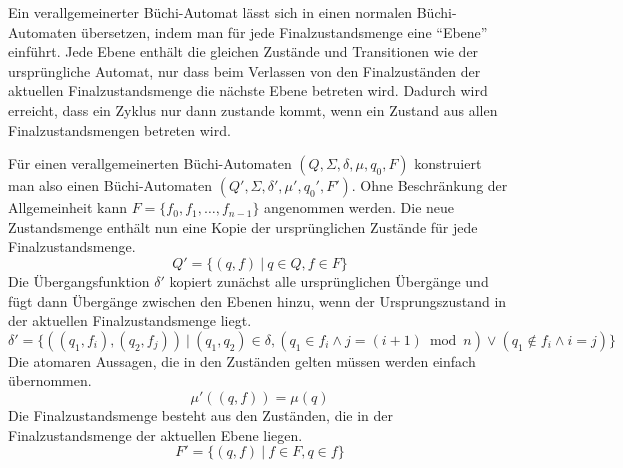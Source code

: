 Ein verallgemeinerter Büchi-Automat lässt sich in einen normalen Büchi-Automaten übersetzen, indem man für jede Finalzustandsmenge eine "`Ebene"' einführt.
Jede Ebene enthält die gleichen Zustände und Transitionen wie der ursprüngliche Automat, nur dass beim Verlassen von den Finalzuständen der aktuellen Finalzustandsmenge die nächste Ebene betreten wird.
Dadurch wird erreicht, dass ein Zyklus nur dann zustande kommt, wenn ein Zustand aus allen Finalzustandsmengen betreten wird.

Für einen verallgemeinerten Büchi-Automaten $(Q,\Sigma,\delta,\mu,q_0,F)$ konstruiert man also einen Büchi-Automaten $(Q',\Sigma,\delta',\mu',q_0',F')$.
Ohne Beschränkung der Allgemeinheit kann $F=\{f_0,f_1,\dots,f_{n-1}\}$ angenommen werden.
Die neue Zustandsmenge enthält nun eine Kopie der ursprünglichen Zustände für jede Finalzustandsmenge.
\[ Q' = \{ (q,f)\ |\ q\in Q, f\in F \} \]
Die Übergangsfunktion $\delta'$ kopiert zunächst alle ursprünglichen Übergänge und fügt dann Übergänge zwischen den Ebenen hinzu, wenn der Ursprungszustand in der aktuellen Finalzustandsmenge liegt.
\[ \delta' = \{ ((q_1,f_i),(q_2,f_j))\ |\ (q_1,q_2)\in\delta, (q_1\in f_i\land j=(i+1)\bmod n)\lor (q_1\not\in f_i\land i=j)\} \]
Die atomaren Aussagen, die in den Zuständen gelten müssen werden einfach übernommen.
\[ \mu'((q,f)) = \mu(q) \]
Die Finalzustandsmenge besteht aus den Zuständen, die in der Finalzustandsmenge der aktuellen Ebene liegen.
\[  F' = \{ (q,f)\ |\ f\in F, q\in f \} \]
